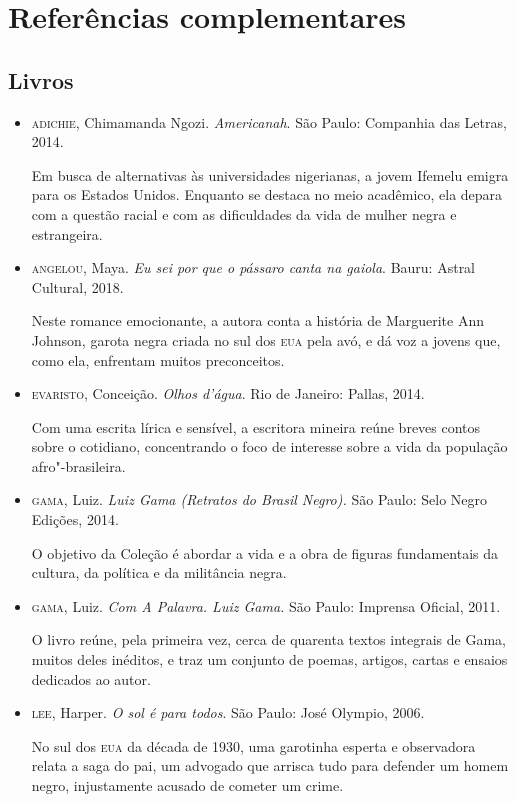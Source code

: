\documentclass[12pt]{extarticle}
\begin{document}
\section{Referências complementares}

\subsection{Livros}
\begin{itemize}
\item\textsc{adichie}, Chimamanda Ngozi. \textit{Americanah}. São Paulo: Companhia
  das Letras, 2014.

Em busca de alternativas às universidades nigerianas, a jovem Ifemelu
emigra para os Estados Unidos. Enquanto se destaca no meio acadêmico,
ela depara com a questão racial e com as dificuldades da vida de mulher
negra e estrangeira.

\item\textsc{angelou}, Maya. \textit{Eu sei por que o pássaro canta na gaiola}.
  Bauru: Astral Cultural, 2018.

Neste romance emocionante, a autora conta a história de Marguerite Ann
Johnson, garota negra criada no sul dos \textsc{eua} pela avó, e dá voz a jovens
que, como ela, enfrentam muitos preconceitos.

\item\textsc{evaristo}, Conceição. \textit{Olhos d'água}. Rio de Janeiro: Pallas, 2014.

Com uma escrita lírica e sensível, a escritora mineira reúne breves
contos sobre o cotidiano, concentrando o foco de interesse sobre a vida
da população afro"-brasileira.

\item\textsc{gama}, Luiz. \textit{Luiz Gama (Retratos do Brasil Negro).} São Paulo:
Selo Negro Edições, 2014.

O objetivo da Coleção é abordar a vida e a obra de figuras fundamentais
da cultura, da política e da militância negra.

\item\textsc{gama}, Luiz. \textit{Com A Palavra. Luiz Gama.} São Paulo: Imprensa
Oficial, 2011.

O livro reúne, pela primeira vez, cerca de quarenta textos integrais de
Gama, muitos deles inéditos, e traz um conjunto de poemas, artigos,
cartas e ensaios dedicados ao autor.

\item\textsc{lee}, Harper. \textit{O sol é para todos}. São Paulo: José Olympio,
  2006.

No sul dos \textsc{eua} da década de 1930, uma garotinha esperta e observadora
relata a saga do pai, um advogado que arrisca tudo para defender um
homem negro, injustamente acusado de cometer um crime.
\end{itemize}
\end{document}
